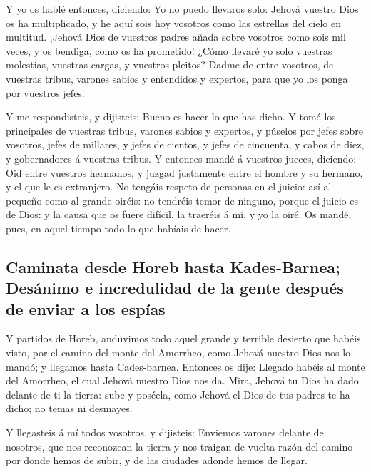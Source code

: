  Y yo os hablé entonces, diciendo: Yo no puedo llevaros
solo:  Jehová vuestro Dios os ha multiplicado, y he aquí
sois hoy vosotros como las estrellas del cielo en multitud.
 ¡Jehová Dios de vuestros padres añada sobre vosotros
como sois mil veces, y os bendiga, como os ha prometido! 
¿Cómo llevaré yo solo vuestras molestias, vuestras cargas, y vuestros
pleitos?  Dadme de entre vosotros, de vuestras tribus,
varones sabios y entendidos y expertos, para que yo los ponga por
vuestros jefes.

 Y me respondisteis, y dijisteis: Bueno es hacer lo que
has dicho.  Y tomé los principales de vuestras tribus,
varones sabios y expertos, y púselos por jefes sobre vosotros, jefes de
millares, y jefes de cientos, y jefes de cincuenta, y cabos de diez, y
gobernadores á vuestras tribus.  Y entonces mandé á
vuestros jueces, diciendo: Oid entre vuestros hermanos, y juzgad
justamente entre el hombre y su hermano, y el que le es extranjero.
 No tengáis respeto de personas en el juicio: así al
pequeño como al grande oiréis: no tendréis temor de ninguno, porque el
juicio es de Dios: y la causa que os fuere difícil, la traeréis á mí, y
yo la oiré.  Os mandé, pues, en aquel tiempo todo lo que
habíais de hacer.

\hypertarget{caminata-desde-horeb-hasta-kades-barnea-desuxe1nimo-e-incredulidad-de-la-gente-despuuxe9s-de-enviar-a-los-espuxedas}{%
\subsection{Caminata desde Horeb hasta Kades-Barnea; Desánimo e
incredulidad de la gente después de enviar a los
espías}\label{caminata-desde-horeb-hasta-kades-barnea-desuxe1nimo-e-incredulidad-de-la-gente-despuuxe9s-de-enviar-a-los-espuxedas}}

 Y partidos de Horeb, anduvimos todo aquel grande y
terrible desierto que habéis visto, por el camino del monte del
Amorrheo, como Jehová nuestro Dios nos lo mandó; y llegamos hasta
Cades-barnea.  Entonces os dije: Llegado habéis al monte
del Amorrheo, el cual Jehová nuestro Dios nos da.  Mira,
Jehová tu Dios ha dado delante de ti la tierra: sube y poséela, como
Jehová el Dios de tus padres te ha dicho; no temas ni desmayes.

 Y llegasteis á mí todos vosotros, y dijisteis: Enviemos
varones delante de nosotros, que nos reconozcan la tierra y nos traigan
de vuelta razón del camino por donde hemos de subir, y de las ciudades
adonde hemos de llegar.

